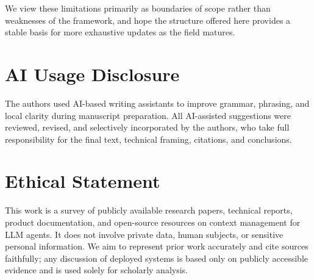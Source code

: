 We view these limitations primarily as boundaries of scope rather than weaknesses of the framework, and hope the structure offered here provides a stable basis for more exhaustive updates as the field matures.



\section*{AI Usage Disclosure}
The authors used AI-based writing assistants to improve grammar, phrasing, and local clarity during manuscript preparation. All AI-assisted suggestions were reviewed, revised, and selectively incorporated by the authors, who take full responsibility for the final text, technical framing, citations, and conclusions.

\section*{Ethical Statement}
This work is a survey of publicly available research papers, technical reports, product documentation, and open-source resources on context management for LLM agents. It does not involve private data, human subjects, or sensitive personal information. We aim to represent prior work accurately and cite sources faithfully; any discussion of deployed systems is based only on publicly accessible evidence and is used solely for scholarly analysis.

